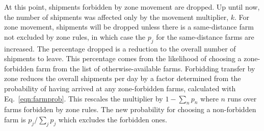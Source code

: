 \documentclass{article}
\begin{document}
At this point, shipments forbidden by zone movement are dropped.
Up until now, the number of shipments was affected only by the 
movement multiplier, $k$. For zone movement, shipments will be dropped
unless there is a same-distance farm not excluded by zone rules,
in which case the $p_j$ for the same-distance farms are increased.
The percentage dropped is a reduction to the overall number
of shipments to leave. This percentage comes from the likelihood
of choosing a zone-forbidden farm from the list of otherwise-available
farms.
Forbidding transfer by zone reduces the overall shipments per day
by a factor determined from the probability of having arrived
at any zone-forbidden farms, calculated with Eq.~\ref{eqn:farmprob}.
This rescales the multiplier by $1-\sum_n p_n$ where $n$ runs over
farms forbidden by zone rules. The new probability for choosing
a non-forbidden farm is $p_j/\sum_j p_j$ which excludes the forbidden
ones.
\end{document}
